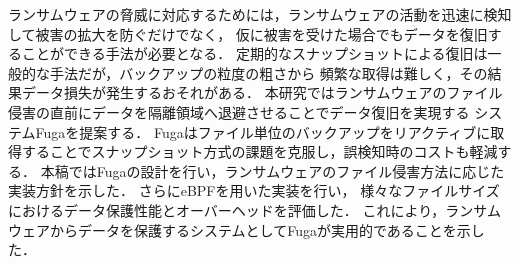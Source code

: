 ランサムウェアの脅威に対応するためには，ランサムウェアの活動を迅速に検知して被害の拡大を防ぐだけでなく，
仮に被害を受けた場合でもデータを復旧することができる手法が必要となる．
定期的なスナップショットによる復旧は一般的な手法だが，バックアップの粒度の粗さから
頻繁な取得は難しく，その結果データ損失が発生するおそれがある．
本研究ではランサムウェアのファイル侵害の直前にデータを隔離領域へ退避させることでデータ復旧を実現する
システムFugaを提案する．
Fugaはファイル単位のバックアップをリアクティブに取得することでスナップショット方式の課題を克服し，誤検知時のコストも軽減する．
本稿ではFugaの設計を行い，ランサムウェアのファイル侵害方法に応じた実装方針を示した．
さらにeBPFを用いた実装を行い，
様々なファイルサイズにおけるデータ保護性能とオーバーヘッドを評価した．
これにより，ランサムウェアからデータを保護するシステムとしてFugaが実用的であることを示した．
